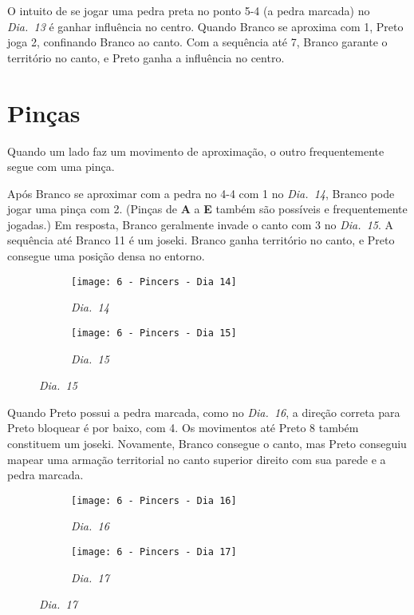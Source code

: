 O intuito de se jogar uma pedra preta no ponto 5-4 (a pedra marcada) no \emph{Dia.\@~13} é ganhar influência no centro. Quando Branco se aproxima com 1, Preto joga 2, confinando Branco ao canto. Com a sequência até 7, Branco garante o território no canto, e Preto ganha a influência no centro.

\pagebreak

\section{Pinças}

Quando um lado faz um movimento de aproximação, o outro frequentemente segue com uma pinça.

Após Branco se aproximar com a pedra no 4-4 com 1 no \emph{Dia.\@~14}, Branco pode jogar uma pinça com 2. (Pinças de \textbf{A} a \textbf{E} também são possíveis e frequentemente jogadas.) Em resposta, Branco geralmente invade o canto com 3 no \emph{Dia.\@~15}. A sequência até Branco 11 é um joseki. Branco ganha território no canto, e Preto consegue uma posição densa no entorno.

\begin{figure}[h!]
    \centering
    \begin{subfigure}[t]{.3\textwidth}
        \centering
        \texttt{[image: 6 - Pincers - Dia 14]}
        \captionsetup{justification=centering}
        \caption*{\emph{Dia.\@~14}}
    \end{subfigure}
    \hspace{1cm}
    \begin{subfigure}[t]{.3\textwidth}
        \centering
        \texttt{[image: 6 - Pincers - Dia 15]}
        \captionsetup{justification=centering}
        \caption*{\emph{Dia.\@~15}}
    \end{subfigure}
\end{figure}

\pagebreak

Quando Preto possui a pedra marcada, como no \emph{Dia.\@~16}, a direção correta para Preto bloquear é por baixo, com 4. Os movimentos até Preto 8 também constituem um joseki. Novamente, Branco consegue o canto, mas Preto conseguiu mapear uma armação territorial no canto superior direito com sua parede e a pedra marcada.

\begin{figure}[h!]
    \centering
    \hspace{-2cm}
    \begin{subfigure}[t]{.3\textwidth}
        \centering
        \texttt{[image: 6 - Pincers - Dia 16]}
        \captionsetup{justification=centering}
        \caption*{\emph{Dia.\@~16}}
    \end{subfigure}
    \hspace{1cm}
    \begin{subfigure}[t]{.3\textwidth}
        \centering
        \texttt{[image: 6 - Pincers - Dia 17]}
        \captionsetup{justification=centering}
        \caption*{\emph{Dia.\@~17}}
    \end{subfigure}
\end{figure}

